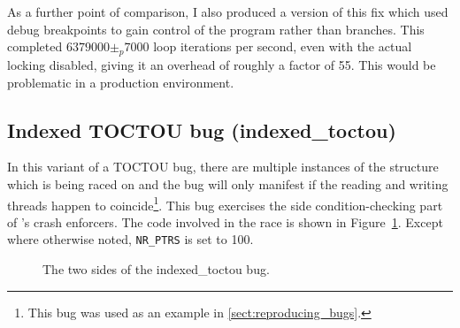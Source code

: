 As a further point of comparison, I also produced a version of this
fix which used debug breakpoints to gain control of the program rather
than branches.  This completed $6379000 \pm_p 7000$ loop iterations per
second, even with the actual locking disabled, giving it an overhead
of roughly a factor of 55.  This would be problematic in a production
environment.

\subsection{Indexed TOCTOU bug (indexed\_toctou)}

\label{sect:eval:indexed_toctou}

In this variant of a TOCTOU bug, there are multiple instances of the
structure which is being raced on and the bug will only manifest if
the reading and writing threads happen to coincide\footnote{This bug
  was used as an example in \autoref{sect:reproducing_bugs}.}.  This
bug exercises the side condition-checking part of {\technique}'s crash
enforcers.  The code involved in the race is shown in
Figure~\ref{fig:eval:indexed_toctou}.  Except where otherwise noted,
\verb|NR_PTRS| is set to 100.

\begin{figure}
  \caption{The two sides of the indexed\_toctou bug.}
  \label{fig:eval:indexed_toctou}
\end{figure}

